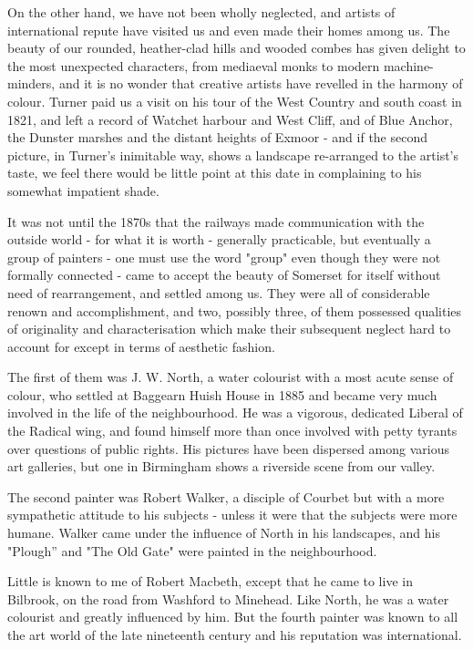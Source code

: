 On the other hand, we have not been wholly neglected, and artists of international repute have visited us and even made their homes among us. The beauty of our rounded, heather-clad hills and wooded combes has given delight to the most unexpected characters, from mediaeval monks to modern machine-minders, and it is no wonder that creative artists have revelled in the harmony of colour. Turner paid us a visit on his tour of the West Country and south coast in 1821, and left a record of Watchet harbour and West Cliff, and of Blue Anchor, the Dunster marshes and the distant heights of Exmoor - and if the second picture, in Turner's inimitable way, shows a landscape re-arranged to the artist's taste, we feel there would be little point at this date in complaining to his somewhat impatient shade.

It was not until the 1870s that the railways made communication with the outside world - for what it is worth - generally practicable, but eventually a group of painters - one must use the word "group" even though they were not formally connected - came to accept the beauty of Somerset for itself without need of rearrangement, and settled among us. They were all of considerable renown and accomplishment, and two, possibly three, of them possessed qualities of originality and characterisation which make their subsequent neglect hard to account for except in terms of aesthetic fashion.

The first of them was J. W. North, a water colourist with a most acute sense of colour, who settled at Baggearn Huish House in 1885 and became very much involved in the life of the neighbourhood. He was a vigorous, dedicated Liberal of the Radical wing, and found himself more than once involved with petty tyrants over questions of public rights. His pictures have been dispersed among various art galleries, but one in Birmingham shows a riverside scene from our valley.

The second painter was Robert Walker, a disciple of Courbet but with a more sympathetic attitude to his subjects - unless it were that the subjects were more humane. Walker came under the influence of North in his landscapes, and his "Plough” and "The Old Gate" were painted in the neighbourhood.

Little is known to me of Robert Macbeth, except that he came to live in Bilbrook, on the road from Washford to Minehead. Like North, he was a water colourist and greatly influenced by him. But the fourth painter was known to all the art world of the late nineteenth century and his reputation was international.

